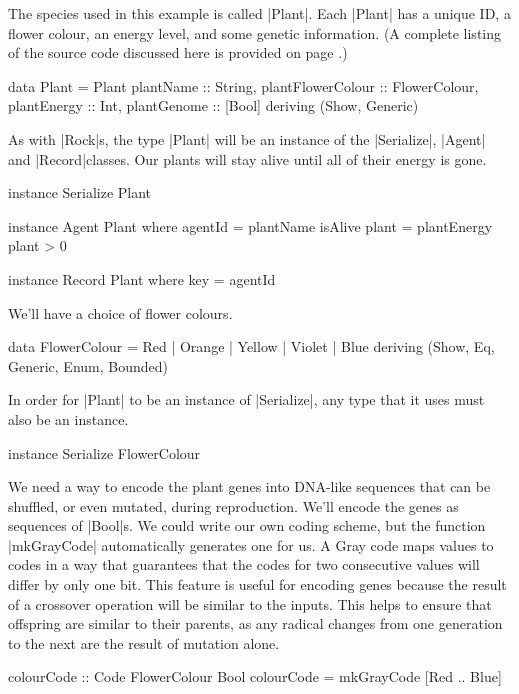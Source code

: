 The species used in this example is called |Plant|.
Each |Plant| has a unique ID, a flower colour,
an energy level, and some genetic information.
(A complete listing of the source code discussed here is provided on 
page \pageref{code:plant}.)

\begin{code}
data Plant = Plant
  { 
    plantName :: String,
    plantFlowerColour :: FlowerColour,
    plantEnergy :: Int,
    plantGenome :: [Bool]
  } deriving (Show, Generic)
\end{code} 

As with |Rock|s, the type |Plant| will be an instance of 
the |Serialize|, |Agent| and |Record|classes.
Our plants will stay alive until all of their energy is gone.

\begin{code}
instance Serialize Plant

instance Agent Plant where
  agentId = plantName
  isAlive plant = plantEnergy plant > 0

instance Record Plant where key = agentId
\end{code} 

We'll have a choice of flower colours.
\begin{code}
data FlowerColour = Red | Orange | Yellow | Violet | Blue
  deriving (Show, Eq, Generic, Enum, Bounded)
\end{code} 

In order for |Plant| to be an instance of |Serialize|,
any type that it uses must also be an instance.

\begin{code}
instance Serialize FlowerColour
\end{code} 

We need a way to encode the plant genes into DNA-like sequences that can
be shuffled, or even mutated, during reproduction.
We'll encode the genes as sequences of |Bool|s.
We could write our own coding scheme, but
the function |mkGrayCode| automatically generates one for us.
A Gray code maps values to codes in a way that guarantees that the codes
for two consecutive values will differ by only one bit. This feature
is useful for encoding genes because the result
of a crossover operation will be similar to the inputs. 
This helps to
ensure that offspring are similar to their parents, as any radical
changes from one generation to the next are the result of mutation
alone.

\begin{code}
colourCode :: Code FlowerColour Bool
colourCode = mkGrayCode [Red .. Blue]
\end{code} 

